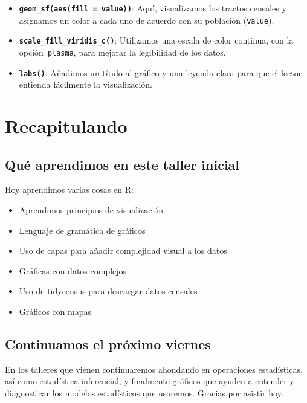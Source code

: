 \documentclass[
]{article}
\providecommand{\tightlist}{%
  \setlength{\itemsep}{0pt}\setlength{\parskip}{0pt}}
\begin{document}
\begin{itemize}
\item
  \textbf{\texttt{geom\_sf(aes(fill\ =\ value))}}: Aquí, visualizamos
  los tractos censales y asignamos un color a cada uno de acuerdo con su
  población (\texttt{value}).
\item
  \textbf{\texttt{scale\_fill\_viridis\_c()}}: Utilizamos una escala de
  color continua, con la opción~\texttt{plasma}, para mejorar la
  legibilidad de los datos.
\item
  \textbf{\texttt{labs()}}: Añadimos un título al gráfico y una leyenda
  clara para que el lector entienda fácilmente la visualización.
\end{itemize}

\section{Recapitulando}\label{recapitulando}

\subsection{Qué aprendimos en este taller
inicial}\label{quuxe9-aprendimos-en-este-taller-inicial}

Hoy aprendimos varias cosas en R:

\begin{itemize}
\tightlist
\item
  Aprendimos principios de visualización
\item
  Lenguaje de gramática de gráficos
\item
  Uso de capas para añadir complejidad visual a los datos
\item
  Gráficas con datos complejos
\item
  Uso de tidycensus para descargar datos censales
\item
  Gráficos con mapas
\end{itemize}

\subsection{Continuamos el próximo
viernes}\label{continuamos-el-pruxf3ximo-viernes}

En los talleres que vienen continuaremos ahondando en operaciones
estadísticas, así como estadística inferencial, y finalmente gráficos
que ayuden a entender y diagnosticar los modelos estadísticos que
usaremos. Gracias por asistir hoy.
\end{document}
